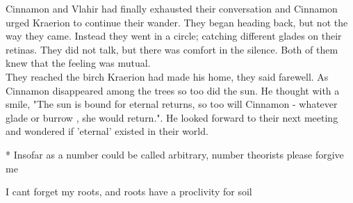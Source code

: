 
Cinnamon and Vlahir had finally exhausted their conversation and Cinnamon urged Kraerion to continue their wander. They began heading back, but not the way they came. Instead they went in a circle; catching different glades on their retinas. They did not talk, but there was comfort in the silence. Both of them knew that the feeling was mutual. \\


They reached the birch Kraerion had made his home, they said farewell. As Cinnamon disappeared among the trees so too did the sun. He thought with a smile, "The sun is bound for eternal returns, so too will Cinnamon - whatever glade or burrow , she would return.". He looked forward to their next meeting and wondered if 'eternal' existed in their world.      


* Insofar as a number could be called arbitrary, number theorists please forgive me

I cant forget my roots, and roots have a proclivity for soil






